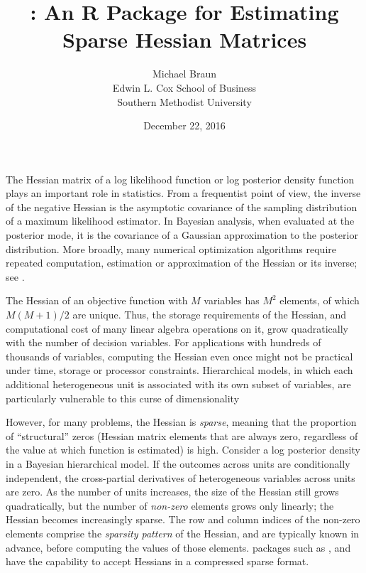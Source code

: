 \documentclass[jss]{jss}\usepackage[]{graphicx}\usepackage[]{color}
\author{Michael Braun\\Edwin L. Cox School of Business\\Southern Methodist University}
\title{\pkg{sparseHessianFD}: An R Package for Estimating Sparse Hessian Matrices}
\date{December 22, 2016}
\begin{document}
The Hessian matrix of a log likelihood function or log posterior
density function plays
an important role in statistics.  From a frequentist point of view,
the inverse of the negative Hessian is the asymptotic covariance of
the sampling distribution of a maximum
likelihood estimator.  In Bayesian analysis, when evaluated at the
posterior mode, it is the covariance of a Gaussian approximation to
the posterior distribution.  More broadly, many numerical optimization
algorithms require repeated computation, estimation or approximation
of the Hessian or its inverse; see \citet{NocedalWright2006}.

The Hessian of an objective function with $M$ variables has $M^2$
elements, of which $M(M+1)/2$ are unique.  Thus, the storage
requirements of the Hessian, and computational cost of many linear
algebra operations on it, grow quadratically with the number of
decision variables.   For
applications with hundreds of thousands of variables, computing the
Hessian even once might not be practical under time, storage or
processor constraints.  Hierarchical models, in
which each additional heterogeneous unit is associated with its own subset of
variables, are particularly vulnerable to this curse of dimensionality

However, for many problems, the Hessian is
\emph{sparse}, meaning that the proportion of  ``structural''  zeros
(Hessian matrix elements that are always zero, regardless of the value at which
function is estimated) is high.  Consider a log
posterior density in a Bayesian hierarchical
model.  If the outcomes across units are conditionally
independent, the cross-partial derivatives of heterogeneous variables
across units are zero.  As the number of units
increases, the size of the Hessian still grows quadratically, but the number
of \emph{non-zero} elements grows only linearly; the Hessian
becomes increasingly sparse.  The row and column indices of the
non-zero elements comprise the \emph{sparsity pattern} of the Hessian,
and are typically known in advance, before computing the values of
those elements.   packages such as 
\citep{R_trustOptim},  \citep{R_sparseMVN} and
 \citep{R_ipoptr} have the capability to accept Hessians
in a compressed sparse format.
\end{document}
